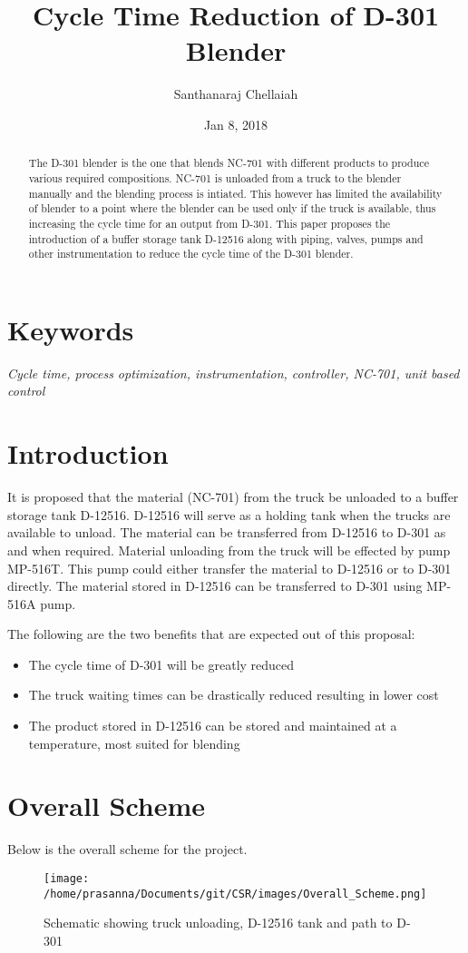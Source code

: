 \documentclass[a4paper,oneside]{article}
\author{Santhanaraj Chellaiah}
\date{Jan 8, 2018}
\title{Cycle Time Reduction of D-301 Blender}
\begin{document}
\maketitle
\begin{abstract}
The D-301 blender is the one that blends NC-701 with different
products to produce various required compositions. NC-701 is unloaded
from a truck to the blender manually and the blending process is
intiated. This however has limited the availability of blender to a
point where the blender can be used only if the truck is available,
thus increasing the cycle time for an output from D-301. This paper
proposes the introduction of a buffer storage tank D-12516 along with
piping, valves, pumps and other instrumentation to reduce the cycle
time of the D-301 blender.
\end{abstract}

\section{Keywords}
\label{sec:org91d40d8}
\emph{Cycle time, process optimization, instrumentation, controller, NC-701, unit based control}

\section{Introduction}
\label{sec:orgfad5b0c}
It is proposed that the material (NC-701) from the truck be unloaded
to a buffer storage tank D-12516. D-12516 will serve as a holding tank
when the trucks are available to unload. The material can be
transferred from D-12516 to D-301 as and when required. Material
unloading from the truck will be effected by pump MP-516T. This pump
could either transfer the material to D-12516 or to D-301
directly. The material stored in D-12516 can be transferred to D-301
using MP-516A pump.  

The following are the two benefits that are expected out of this proposal: 
\begin{itemize}
\item The cycle time of D-301 will be greatly reduced
\item The truck waiting times can be drastically reduced resulting in lower cost
\item The product stored in D-12516 can be stored and maintained at a
temperature, most suited for blending
\end{itemize}
\section{Overall Scheme}
\label{sec:org905994b}
Below is the overall scheme for the project. 
\begin{figure}[htbp]
\centering
\texttt{[image: /home/prasanna/Documents/git/CSR/images/Overall\_Scheme.png]}
\caption{Schematic showing truck unloading, D-12516 tank and path to D-301}
\end{figure}
\end{document}
